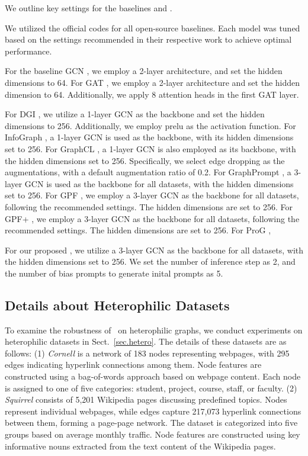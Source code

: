 We outline key settings for the baselines and \model. 

We utilized the official codes for all open-source baselines. Each model was tuned based on the settings recommended in their respective work to achieve optimal performance.

For the baseline GCN \cite{kipf2016semi}, we employ a 2-layer architecture, and set the hidden dimensions to 64. 
For GAT \cite{velivckovic2017graph}, we employ a 2-layer architecture and set the hidden dimension to 64. Additionally, we apply 8 attention heads in the first GAT layer.

For DGI \cite{velivckovic2017graph}, we utilize a 1-layer GCN as the backbone and set the hidden dimensions to 256. Additionally, we employ prelu as the activation function.
For InfoGraph \cite{sun2019infograph}, a 1-layer GCN is used as the backbone, with its hidden dimensions set to 256.
For GraphCL \cite{you2020graph}, a 1-layer GCN is also employed as its backbone, with the hidden dimensions set to 256. Specifically, we select edge dropping as the augmentations, with a default augmentation ratio of 0.2.
For GraphPrompt \cite{liu2023graphprompt}, a 3-layer GCN is used as the backbone for all datasets, with the hidden dimensions set to 256.
For GPF \cite{fang2024universal}, we employ a 3-layer GCN as the backbone for all datasets, following the recommended settings. The hidden dimensions are set to 256.
For GPF+ \cite{fang2024universal}, we employ a 3-layer GCN as the backbone for all datasets, following the recommended settings. The hidden dimensions are set to 256.
For ProG \cite{sun2023all},

For our proposed \model, we utilize a 3-layer GCN as the backbone for all datasets, with the hidden dimensions set to 256. We set the number of inference step as 2, and the number of bias prompts to generate inital prompts as 5.


\subsection{Details about Heterophilic Datasets}\label{app.hetero}
To examine the robustness of \model\ on heterophilic graphs, we conduct experiments on heterophilic datasets in Sect.~\ref{sec.hetero}. The details of these datasets are as follows:
(1) \emph{Cornell} \cite{pei2020geom} is a network of 183 nodes representing webpages, with 295 edges indicating hyperlink connections among them. Node features are constructed using a bag-of-words approach based on webpage content. Each node is assigned to one of five categories: student, project, course, staff, or faculty.
(2) \textit{Squirrel} \cite{rozemberczki2021multi} consists of 5,201 Wikipedia pages discussing predefined topics. Nodes represent individual webpages, while edges capture 217,073 hyperlink connections between them, forming a page-page network. The dataset is categorized into five groups based on average monthly traffic. Node features are constructed using key informative nouns extracted from the text content of the Wikipedia pages.

